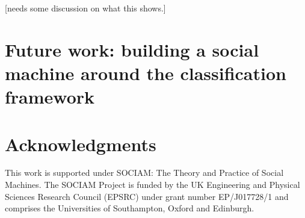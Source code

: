 \documentclass{sig-alternate}
\begin{document}
[needs some discussion on what this shows.]

\section{Future work: building a social machine around the classification framework}

\section{Acknowledgments}

This work is supported under SOCIAM: The Theory and Practice of Social Machines.  The SOCIAM Project is funded by the UK Engineering and Physical Sciences Research Council (EPSRC) under grant number EP/J017728/1 and comprises the Universities of Southampton, Oxford and Edinburgh.

%

%
%


\balancecolumns %
\end{document}

